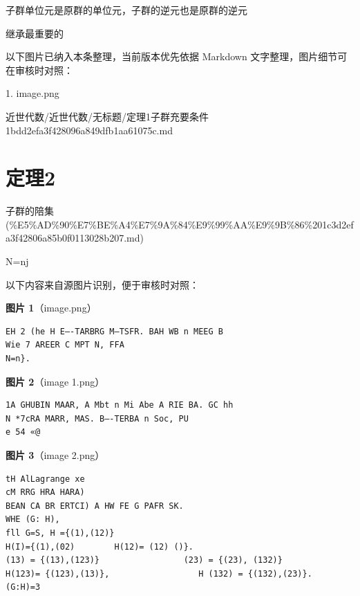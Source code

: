 \begin{theorem}[定理1子群充要条件]

子群单位元是原群的单位元，子群的逆元也是原群的逆元

继承最重要的

\end{theorem}

\begin{note}[关联图片]
以下图片已纳入本条整理，当前版本优先依据 Markdown 文字整理，图片细节可在审核时对照：

1. image.png\\

\end{note}

\begin{note}[来源路径]

近世代数/近世代数/无标题/定理1子群充要条件 1bdd2efa3f428096a849dfb1aa61075c.md

\end{note}

\section*{定理2}

\begin{note}[来源上级主题]

子群的陪集 (\%E5\%AD\%90\%E7\%BE\%A4\%E7\%9A\%84\%E9\%99\%AA\%E9\%9B\%86\%201c3d2efa3f42806a85b0f0113028b207.md)

\end{note}

\begin{theorem}[定理2]

N=nj

\end{theorem}

\begin{note}
以下内容来自源图片识别，便于审核时对照：

\textbf{图片 1}（image.png）
\begin{Verbatim}[fontsize=\small]
EH 2 (he H E—-TARBRG M—TSFR. BAH WB n MEEG B
Wie 7 AREER C MPT N, FFA
N=n}.
\end{Verbatim}

\textbf{图片 2}（image 1.png）
\begin{Verbatim}[fontsize=\small]
1A GHUBIN MAAR, A Mbt n Mi Abe A RIE BA. GC hh
N *7cRA MARR, MAS. B—-TERBA n Soc, PU
e 54 «@
\end{Verbatim}

\textbf{图片 3}（image 2.png）
\begin{Verbatim}[fontsize=\small]
tH AlLagrange xe
cM RRG HRA HARA)
BEAN CA BR ERTCI) A HW FE G PAFR SK.
WHE (G: H),
fll G=S, H ={(1),(12)}
H(I)={(1),(02)        H(12)= (12) ()}.
(13) = {(13),(123)}                 (23) = {(23), (132)}
H(123)= {(123),(13)},                  H (132) = {(132),(23)}.
(G:H)=3
\end{Verbatim}

\end{note}

